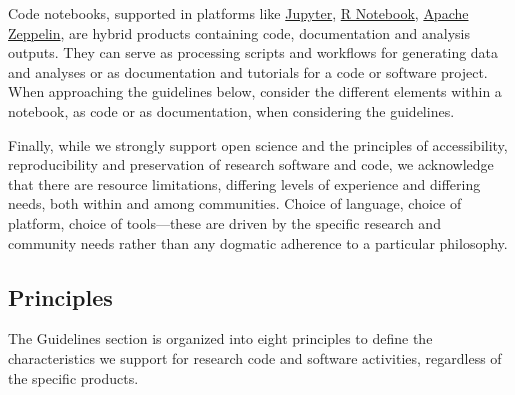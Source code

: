 \documentclass{article}
\begin{document}
Code notebooks, supported in platforms like \href{http://jupyter.org/} {Jupyter}, \href{http://rmarkdown.rstudio.com/r_notebooks.html} {R Notebook}, \href{http://zeppelin.apache.org/} {Apache Zeppelin}, are hybrid products containing code, documentation and analysis outputs. They can serve as processing scripts and workflows for generating data and analyses or as documentation and tutorials for a code or software project. When approaching the guidelines below, consider the different elements within a notebook, as code or as documentation, when considering the guidelines. 
 
Finally, while we strongly support open science and the principles of accessibility, reproducibility and preservation of research software and code, we acknowledge that there are resource limitations, differing levels of experience and differing needs, both within and among communities. Choice of language, choice of platform, choice of tools—these are driven by the specific research and community needs rather than any dogmatic adherence to a particular philosophy.


\subsection{Principles}
The Guidelines section is organized into eight principles to define the characteristics we support for research code and software activities, regardless of the specific products.  
 
\end{document}
